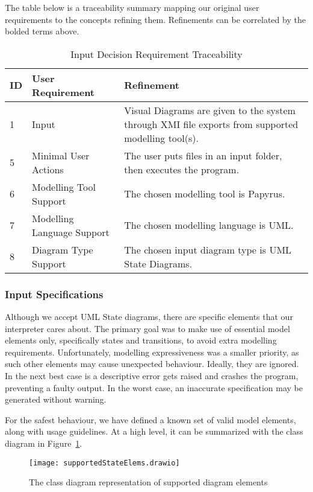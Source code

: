 The table below is a traceability summary mapping our original user requirements to the concepts refining them.
Refinements can be correlated by the bolded terms above.

\begin{table}[htbp]
    \centering
    \caption{Input Decision Requirement Traceability}\label{tab:input-table}
    \begin{tabularx}{\textwidth}{| l | l | X |}
        \hline
        \textbf{ID} & \textbf{User Requirement} & \textbf{Refinement} \\
        \hline
        1 & Input & Visual Diagrams are given to the system through XMI file exports from supported modelling tool(s). \\ \hline
        5 & Minimal User Actions & The user puts files in an input folder, then executes the program.  \\ \hline
        6 & Modelling Tool Support & The chosen modelling tool is Papyrus. \\ \hline
        7 & Modelling Language Support & The chosen modelling language is UML. \\ \hline
        8 & Diagram Type Support & The chosen input diagram type is UML State Diagrams. \\ \hline
    \end{tabularx}
\end{table}

\subsubsection{Input Specifications}\label{subsubsec:input-specification}
Although we accept UML State diagrams, there are specific elements that our interpreter cares about.
The primary goal was to make use of essential model elements only, specifically states and transitions,
to avoid extra modelling requirements.
Unfortunately, modelling expressiveness was a smaller priority, as such
other elements may cause unexpected behaviour.
Ideally, they are ignored.
In the next best case is a descriptive error gets raised and crashes the program, preventing a faulty output.
In the worst case, an inaccurate specification may be generated without warning.

For the safest behaviour, we have defined a known set of valid model elements, along with usage guidelines.
At a high level, it can be summarized with the class diagram in Figure~\ref{fig:supportedElems}.
\begin{figure}[ht]
    \centering
    \texttt{[image: supportedStateElems.drawio]}
    \caption{The class diagram representation of supported diagram elements}
    \label{fig:supportedElems}
\end{figure}
\newpage

